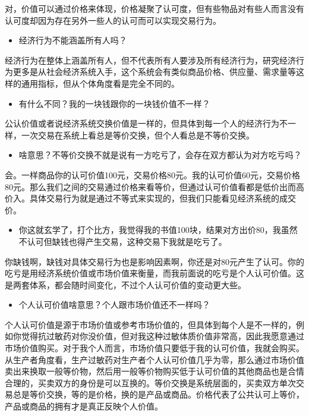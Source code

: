 \documentclass[
  letterpaper,
  DIV=11,
  numbers=noendperiod]{scrreprt}
\providecommand{\tightlist}{%
  \setlength{\itemsep}{0pt}\setlength{\parskip}{0pt}}\usepackage{longtable,booktabs,array}
\begin{document}
对，价值可以通过价格来体现，价格凝聚了认可度，但有些物品对有些人而言没有认可度却因为存在另外一些人的认可而可以实现交易行为。

\begin{itemize}
\tightlist
\item
  经济行为不能涵盖所有人吗？
\end{itemize}

经济行为在整体上涵盖所有人，但不代表所有人要涉及所有经济行为，研究经济行为更多是从社会经济系统入手，这个系统会有类似商品价格、供应量、需求量等这样的通用指标，但从个体角度看是完全不同的。

\begin{itemize}
\tightlist
\item
  有什么不同？我的一块钱跟你的一块钱价值不一样？
\end{itemize}

公认价值或者说经济系统交换价值是一样的，但具体到每一个人的经济行为不一样，一次交易在系统上看总是等价交换，但个人看总是不等价交换。

\begin{itemize}
\tightlist
\item
  啥意思？不等价交换不就是说有一方吃亏了，会存在双方都认为对方吃亏吗？
\end{itemize}

会。一样商品你的认可价值100元，交易价格80元。我的认可价值60元，交易价格80元。那么我们之间的交易通过价格来看等价，但通过认可价值看都是低价出而高价入。具体交易行为就是通过不等式来实现的，但我们只能看见经济系统的成交价。

\begin{itemize}
\tightlist
\item
  你这就玄学了，打个比方，我觉得我的书值100块，结果对方出价80，我虽然不认可但缺钱也得产生交易，这种交易下我就是吃亏了。
\end{itemize}

你缺钱啊，缺钱对具体交易行为也是影响因素啊，你还是对80元产生了认可。你的吃亏是用经济系统价值或市场价值来衡量，而我前面说的吃亏是个人认可价值。这是两套体系，都会随时间变化，不过个人认可价值的变动更大些。

\begin{itemize}
\tightlist
\item
  个人认可价值啥意思？个人跟市场价值还不一样吗？
\end{itemize}

个人认可价值是源于市场价值或参考市场价值的，但具体到每个人是不一样的，例如你觉得抗过敏药对你没价值，但对我这种过敏体质价值非常高，因此我愿意通过市场价值购买。对于我个人而言，市场价值只要低于我的认可价值，我就会购买。从生产者角度看，生产过敏药对生产者个人认可价值几乎为零，那么通过市场价值卖出来换取一般等价物，然后用一般等价物购买低于认可价值的其他商品也是合情合理的，买卖双方的身份是可以互换的。等价交换是系统层面的，买卖双方单次交易总是等价交换，等的是价格，换的是产品或商品。价格代表了公共认可上等价，产品或商品的拥有才是真正反映个人价值。
\end{document}
